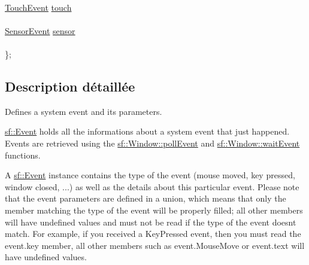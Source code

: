 \begin{DoxyCompactItemize}
\begin{tabbing}
\>\\
\>\hyperlink{structsf_1_1Event_1_1TouchEvent}{TouchEvent} \hyperlink{classsf_1_1Event_a5f6ed8e499a4c3d171ff1baab469b2ee}{touch}\\
\>\\
\>\hyperlink{structsf_1_1Event_1_1SensorEvent}{SensorEvent} \hyperlink{classsf_1_1Event_acdeacbb321655b962e27d08eeec5a190}{sensor}\\
\>\\
\}; \\

\end{tabbing}\end{DoxyCompactItemize}


\subsection{Description détaillée}
Defines a system event and its parameters. 

\hyperlink{classsf_1_1Event}{sf\+::\+Event} holds all the informations about a system event that just happened. Events are retrieved using the \hyperlink{classsf_1_1Window_a338e996585faf82e93069858e3b531b7}{sf\+::\+Window\+::poll\+Event} and \hyperlink{classsf_1_1Window_aaf02ab64fbc1d374eef3696df54137bc}{sf\+::\+Window\+::wait\+Event} functions.

A \hyperlink{classsf_1_1Event}{sf\+::\+Event} instance contains the type of the event (mouse moved, key pressed, window closed, ...) as well as the details about this particular event. Please note that the event parameters are defined in a union, which means that only the member matching the type of the event will be properly filled; all other members will have undefined values and must not be read if the type of the event doesn\textquotesingle{}t match. For example, if you received a Key\+Pressed event, then you must read the event.\+key member, all other members such as event.\+Mouse\+Move or event.\+text will have undefined values.

